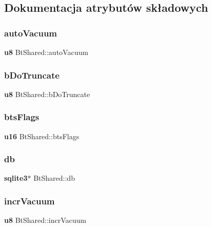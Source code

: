 \subsection{Dokumentacja atrybutów składowych}
\mbox{\label{struct_bt_shared_a770c4f6244d4350f27029cb909902a61}} 
\subsubsection{autoVacuum}
{\footnotesize\ttfamily \textbf{ u8} Bt\+Shared\+::auto\+Vacuum}

\mbox{\label{struct_bt_shared_a57de6e40475fc532a5de79760521e957}} 
\subsubsection{bDoTruncate}
{\footnotesize\ttfamily \textbf{ u8} Bt\+Shared\+::b\+Do\+Truncate}

\mbox{\label{struct_bt_shared_a287b7749063c63e45518f72d6f9b3c1d}} 
\subsubsection{btsFlags}
{\footnotesize\ttfamily \textbf{ u16} Bt\+Shared\+::bts\+Flags}

\mbox{\label{struct_bt_shared_a93dafa672793f6117a336d5987951c8e}} 
\subsubsection{db}
{\footnotesize\ttfamily \textbf{ sqlite3}$\ast$ Bt\+Shared\+::db}

\mbox{\label{struct_bt_shared_a8d8ba06335a63d8a36294a0f1ae8377a}} 
\subsubsection{incrVacuum}
{\footnotesize\ttfamily \textbf{ u8} Bt\+Shared\+::incr\+Vacuum}

\mbox{\label{struct_bt_shared_aeaa6c0f33b83434ecee4bd8c4c8df48e}} 
